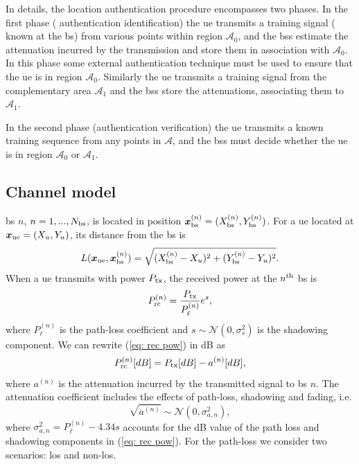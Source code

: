 \documentclass[draftcls,onecolumn,12pt]{IEEEtran}
\begin{document}
In details, the location authentication procedure encompasses two phases. In the first phase ( authentication identification) the \ac{ue} transmits a training signal ( known at the \acs{bs}) from various points within region $\mathcal{A}_0$, and the \acp{bs} estimate the attenuation incurred by the transmission and store them in association with $\mathcal{A}_0$. In this phase some external authentication technique must be used to ensure that the \ac{ue} is in region $\mathcal{A}_0$. Similarly the \ac{ue} transmits a training signal from the complementary area $\mathcal{A}_1$ and the \acp{bs} store the attenuations, associating them to $\mathcal{A}_1$.

In the second phase (authentication verification) the \ac{ue} transmits a known training sequence from any points in $\mathcal{A}$, and the \acp{bs} must decide whether the \ac{ue} is in region $\mathcal{A}_0$ or $\mathcal{A}_1$.

\subsection{Channel model}

\Ac{bs} $n$, $n=1,...,N_{\rm bs}$, is located in position $\bm{x}_{\rm bs}^{(n)} =(X_{\rm bs}^{(n)},Y_{\rm bs}^{(n)})$. For a \ac{ue} located at $\bm{x}_{\rm ue}=(X_u,Y_u)$, its distance from the \ac{bs} is
\begin{equation}
    L(\bm{x}_{\rm ue},\bm{x}_{\rm bs}^{(n)}) = \sqrt{(X_{\rm bs}^{(n)}-X_u)^2+(Y_{\rm bs}^{(n)}-Y_u)^2}.
\end{equation}
When a \ac{ue} transmits with power $P_{\rm tx}$, the received power at the $n^{\rm th}$ \ac{bs} is
\begin{equation}\label{eq: rec pow}
    P_{\rm rc}^{(n)}= \frac{P_{\rm tx}}{P_{\ell}^{(n)}}e^{s},
\end{equation}
where $P_{\ell}^{(n)}$ is the path-loss coefficient and $s \sim \mathcal{N}(0,\sigma_s^2)$ is the shadowing component. We can rewrite (\ref{eq: rec pow}) in dB as
\begin{equation}
    P_{\rm rc}^{(n)}[dB]= P_{\rm tx}[dB] -  a^{(n)}[dB],
\end{equation}
where $a^{(n)}$ is the attenuation incurred by the transmitted signal to \ac{bs} $n$. The attenuation coefficient includes the effects of path-loss, shadowing and fading, i.e.
\begin{equation}
    \sqrt{a^{(n)}} \sim \mathcal{N}\left(0,\sigma_{a,n}^2\right),
\end{equation}
where $\sigma_{a,n}^2=P_{\ell}^{(n)}-4.34s$ accounts for the dB value of the path loss and shadowing components in (\ref{eq: rec pow}).  For the path-loss we consider two scenarios: \ac{los} and non-\ac{los}.
\end{document}
